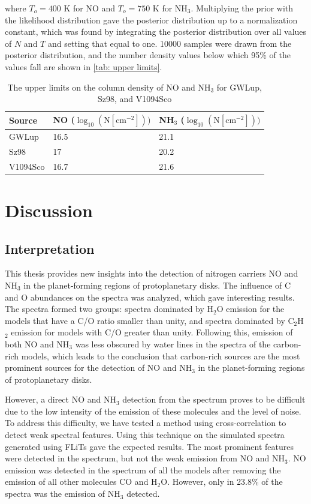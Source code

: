 \documentclass[oneside, single, authoryear, semicolon, 12pt]{lion-msc}
\newcommand{\4}{$_4$}
\newcommand{\3}{$_3$}
\newcommand{\2}{$_2$}
\begin{document}
where $T_o=400$ K for NO and $T_o=750$ K for NH\3. Multiplying the prior with the likelihood distribution gave the posterior distribution up to a normalization constant, which was found by integrating the posterior distribution over all values of $N$ and $T$ and setting that equal to one. 10000 samples were drawn from the posterior distribution, and the number density values below which 95\% of the values fall are shown in \autoref{tab: upper limits}.

\begin{table}[H]
\begin{tabular}{lll}
\hline
Source   & NO ($\log_{10}(\mathrm{N[cm^{-2}]}))$   & NH\3 ($\log_{10}(\mathrm{N[cm^{-2}]}))$\\ \hline
GWLup    & 16.5 & 21.1               \\
Sz98     & 17   & 20.2               \\
V1094Sco & 16.7 & 21.6               \\ \hline
\end{tabular}
\caption{The upper limits on the column density of NO and NH\3 for GWLup, Sz98, and V1094Sco}
\label{tab: upper limits}
\end{table}



\chapter{Discussion}\label{Ch: Discussion}
\section{Interpretation}
This thesis provides new insights into the detection of nitrogen carriers NO and NH\3 in the planet-forming regions of protoplanetary disks. The influence of C and O abundances on the spectra was analyzed, which gave interesting results. The spectra formed two groups: spectra dominated by H\2O emission for the models that have a C/O ratio smaller than unity, and spectra dominated by C\2H\2 emission for models with C/O greater than unity. Following this, emission of both NO and NH\3 was less obscured by water lines in the spectra of the carbon-rich models, which leads to the conclusion that carbon-rich sources are the most prominent sources for the detection of NO and NH\3 in the planet-forming regions of protoplanetary disks. 

However, a direct NO and NH\3 detection from the spectrum proves to be difficult due to the low intensity of the emission of these molecules and the level of noise. To address this difficulty, we have tested a method using cross-correlation to detect weak spectral features. Using this technique on the simulated spectra generated using FLiTs gave the expected results. The most prominent features were detected in the spectrum, but not the weak emission from NO and NH\3. NO emission was detected in the spectrum of all the models after removing the emission of all other molecules CO and H\2O. However, only in 23.8\% of the spectra was the emission of NH\3 detected.
\end{document}
